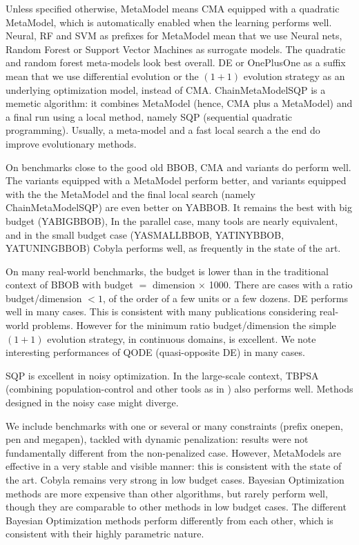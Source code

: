 Unless specified otherwise, MetaModel means CMA equipped with a quadratic MetaModel, which is automatically enabled when the learning performs well.
Neural, RF and SVM as prefixes for MetaModel mean that we use Neural nets, Random Forest or Support Vector Machines as
surrogate models. The quadratic and random forest meta-models look best overall. DE or OnePlusOne as a suffix mean that
we use differential evolution or the $(1+1)$ evolution strategy as an underlying optimization model, instead of CMA.
ChainMetaModelSQP is a memetic algorithm: it combines MetaModel (hence, CMA plus a MetaModel) and a final run using a local method, namely SQP (sequential quadratic programming).
Usually, a meta-model and a fast local search a the end do improve evolutionary methods.

On benchmarks close to the good old BBOB, CMA and variants do perform well. The variants equipped with a MetaModel perform better, and
variants equipped with the the MetaModel and the final local search (namely ChainMetaModelSQP) are even better on YABBOB. It
remains the best with big budget (YABIGBBOB), In the parallel case, many tools are nearly equivalent, and in the small
budget case (YASMALLBBOB, YATINYBBOB, YATUNINGBBOB) Cobyla performs well, as frequently in the state of the art.%

On many real-world benchmarks, the budget is lower than in the traditional context of BBOB with budget $=$ dimension $\times$ 1000. There
are cases with a ratio budget/dimension $<1$, of the order of a few units or a few dozens. DE performs well in many
cases. This is consistent with many publications considering real-world problems. %
However for the minimum ratio budget/dimension the simple $(1+1)$ evolution strategy, in continuous domains, is
excellent.
We note interesting performances of QODE (quasi-opposite DE) in many cases.

SQP is excellent in noisy optimization. In the large-scale context, TBPSA (combining population-control\cite{mlis} and other tools as in \cite{vasilfoga}) also performs well.
Methods designed in the noisy case might diverge.

We include benchmarks with one or several or many constraints (prefix onepen, pen and megapen), tackled with dynamic
penalization: results were not fundamentally different from the non-penalized case. However, MetaModels are effective in
a very stable and visible manner: this is consistent with the state of the art.%
Cobyla remains very strong in low budget cases. Bayesian Optimization methods are more expensive than other algorithms,
but rarely perform well, though they are comparable to other methods in low budget cases. The different Bayesian
Optimization methods perform differently from each other, which is consistent with their highly parametric nature.

